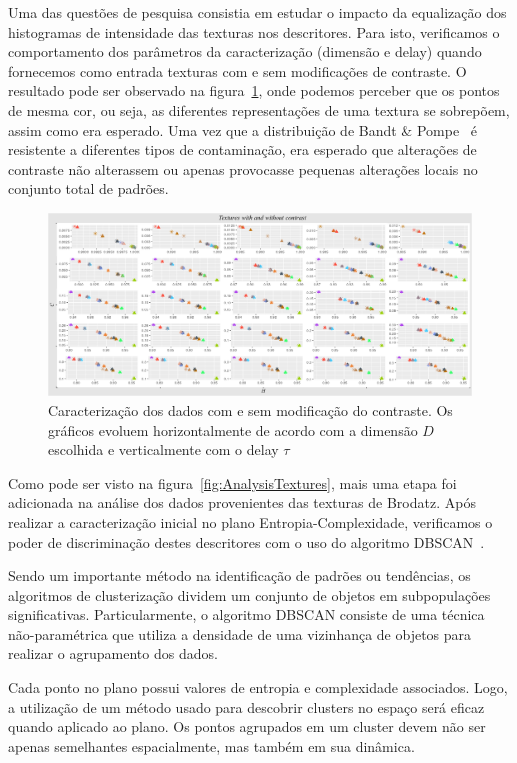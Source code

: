 \documentclass[remotesensing,article,submit,moreauthors,pdftex,10pt,a4paper]{Definitions/mdpi}
\begin{document}
	Uma das questões de pesquisa consistia em estudar o impacto da equalização dos histogramas de intensidade das texturas nos descritores. 
	Para isto, verificamos o comportamento dos parâmetros da caracterização (dimensão e delay) quando fornecemos como entrada texturas com e sem modificações de contraste. 
	O resultado pode ser observado na figura~\ref{fig:TexturesContrast}, onde podemos perceber que os pontos de mesma cor, ou seja, as diferentes representações de uma textura se sobrepõem, assim como era esperado. 
	Uma vez que a distribuição de Bandt \& Pompe~\cite{Bandt2002Permutation} é resistente a diferentes tipos de contaminação, era esperado que alterações de contraste não alterassem ou apenas provocasse pequenas alterações locais no conjunto total de padrões.
	
	\begin{figure}[!h]
		\centering
		\includegraphics[scale = 0.4]{Figures/TexturesContrast.png}    
		\caption{Caracterização dos dados com e sem modificação do contraste. Os gráficos evoluem horizontalmente de acordo com a dimensão $D$ escolhida e verticalmente com o delay $\tau$}
		\label{fig:TexturesContrast}
	\end{figure}
	
	Como pode ser visto na figura~\ref{fig:AnalysisTextures}, mais uma etapa foi adicionada na análise dos dados provenientes das texturas de Brodatz. 
	Após realizar a caracterização inicial no plano Entropia-Complexidade, verificamos o poder de discriminação destes descritores com o uso do algoritmo DBSCAN~\cite{Ester1996DBSCAN}. 
	
	Sendo um importante método na identificação de padrões ou tendências, os algoritmos de clusterização dividem um conjunto de objetos em subpopulações significativas.
	Particularmente, o algoritmo DBSCAN consiste de uma técnica não-paramétrica que utiliza a densidade de uma vizinhança de objetos para realizar o agrupamento dos dados.
	
	Cada ponto no plano possui valores de entropia e complexidade associados. Logo, a utilização de um método usado para descobrir clusters no espaço será eficaz quando aplicado ao plano. 
	Os pontos agrupados em um cluster devem não ser apenas semelhantes espacialmente, mas também em sua dinâmica.
	
\end{document}
